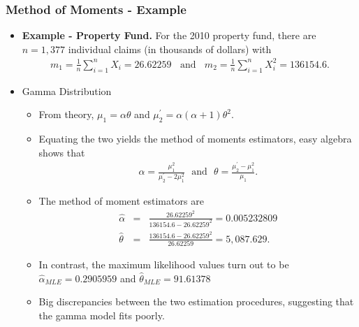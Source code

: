 \documentclass{beamer}
\begin{document}
\begin{frame}%
\frametitle{Method of Moments - Example}
\begin{itemize}
\item \textbf{Example - Property Fund.} For the 2010 property fund, there are $n=1,377$ individual claims (in thousands of dollars) with
\begin{eqnarray*}
m_1 = \frac{1}{n} \sum_{i=1}^n X_i = 26.62259 \ \ \ \
\text{and} \ \ \ \
 m_2 = \frac{1}{n} \sum_{i=1}^n X_i^2 = 136154.6 .
\end{eqnarray*}
\item Gamma Distribution
\begin{itemize}
\item From theory, $\mu_1 = \alpha \theta$ and $\mu_2^{\prime} = \alpha(\alpha+1) \theta^2$.
\item Equating the two yields the method of moments estimators, easy algebra shows that
\begin{eqnarray*}
\alpha = \frac{\mu_1^2}{\mu_2^{\prime}-2\mu_1^2}  \ \ \ \text{and} \ \ \  \theta = \frac{\mu_2^{\prime}-\mu_1^2}{\mu_1}.
\end{eqnarray*}
\item The method of moment estimators are
\begin{eqnarray*}
\hat{\alpha} &=& \frac{26.62259^2}{136154.6-26.62259^2} = 0.005232809\\
\hat{\theta} &=& \frac{136154.6-26.62259^2}{26.62259} = 5,087.629.
\end{eqnarray*}
\item In contrast, the maximum likelihood values turn out to be $\hat{\alpha}_{MLE} =  0.2905959$ and $\hat{\theta}_{MLE} = 91.61378$
\item Big discrepancies between the two estimation procedures, suggesting that the gamma model fits poorly.
\end{itemize}\end{itemize}
\end{frame}
\end{document}
